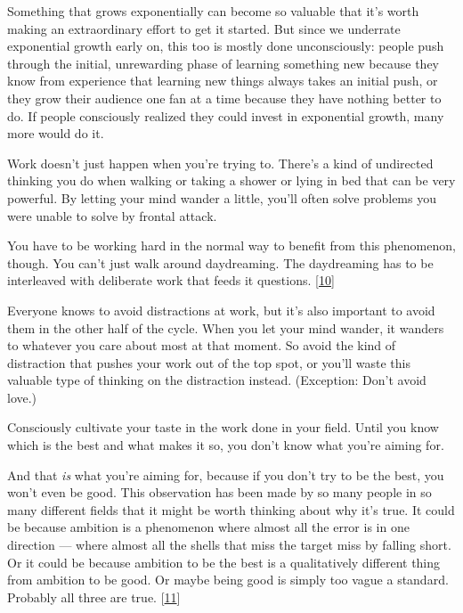 Something that grows exponentially can
                  become so valuable that it's worth making an extraordinary
                  effort to get it started. But since we underrate exponential
                  growth early on, this too is mostly done unconsciously: people
                  push through the initial, unrewarding phase of learning
                  something new because they know from experience that learning
                  new things always takes an initial push, or they grow their
                  audience one fan at a time because they have nothing better to
                  do. If people consciously realized they could invest in
                  exponential growth, many more would do it.






                  Work doesn't just happen when you're trying to. There's a kind
                  of undirected thinking you do when walking or taking a shower
                  or lying in bed that can be very powerful. By letting your
                  mind wander a little, you'll often solve problems you were
                  unable to solve by frontal attack.

You have to be
                  working hard in the normal way to benefit from this
                  phenomenon, though. You can't just walk around daydreaming.
                  The daydreaming has to be interleaved with deliberate work
                  that feeds it questions.
                  [\href{\#f10n}{10}]

Everyone knows to avoid distractions at work, but
                  it's also important to avoid them in the other half of the
                  cycle. When you let your mind wander, it wanders to whatever
                  you care about most at that moment. So avoid the kind of
                  distraction that pushes your work out of the top spot, or
                  you'll waste this valuable type of thinking on the distraction
                  instead. (Exception: Don't avoid love.)






                  Consciously cultivate your taste in the work done in your
                  field. Until you know which is the best and what makes it so,
                  you don't know what you're aiming for.

And that
                  \emph{is} what you're aiming for, because if you don't try to
                  be the best, you won't even be good. This observation has been
                  made by so many people in so many different fields that it
                  might be worth thinking about why it's true. It could be
                  because ambition is a phenomenon where almost all the error is
                  in one direction --- where almost all the shells that miss
                  the target miss by falling short. Or it could be because
                  ambition to be the best is a qualitatively different thing
                  from ambition to be good. Or maybe being good is simply too
                  vague a standard. Probably all three are true.
                  [\href{\#f11n}{11}]

